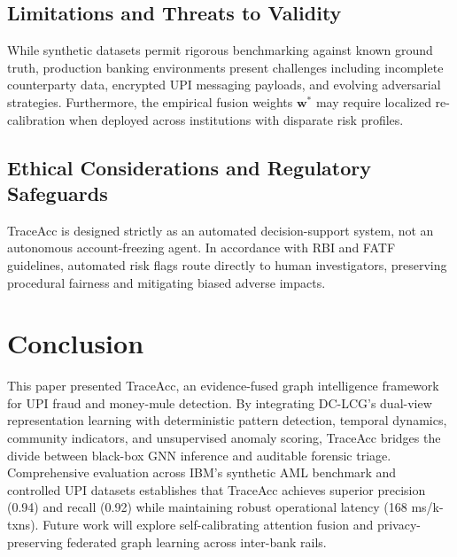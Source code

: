 \documentclass[journal]{IEEEtran}
\begin{document}
\subsection{Limitations and Threats to Validity}
While synthetic datasets permit rigorous benchmarking against known ground truth, production banking environments present challenges including incomplete counterparty data, encrypted UPI messaging payloads, and evolving adversarial strategies. Furthermore, the empirical fusion weights $\mathbf{w}^*$ may require localized re-calibration when deployed across institutions with disparate risk profiles.

\subsection{Ethical Considerations and Regulatory Safeguards}
TraceAcc is designed strictly as an automated decision-support system, not an autonomous account-freezing agent. In accordance with RBI and FATF guidelines, automated risk flags route directly to human investigators, preserving procedural fairness and mitigating biased adverse impacts.

\section{Conclusion}
This paper presented TraceAcc, an evidence-fused graph intelligence framework for UPI fraud and money-mule detection. By integrating DC-LCG's dual-view representation learning with deterministic pattern detection, temporal dynamics, community indicators, and unsupervised anomaly scoring, TraceAcc bridges the divide between black-box GNN inference and auditable forensic triage. Comprehensive evaluation across IBM's synthetic AML benchmark and controlled UPI datasets establishes that TraceAcc achieves superior precision (0.94) and recall (0.92) while maintaining robust operational latency (168 ms/k-txns). Future work will explore self-calibrating attention fusion and privacy-preserving federated graph learning across inter-bank rails.

\balance


\end{document}
